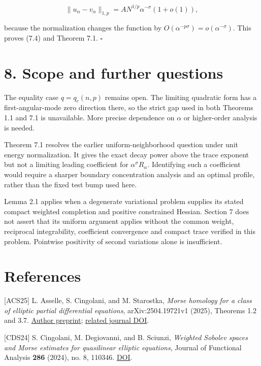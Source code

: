 \documentclass[11pt]{article}
\begin{document}
\[
\|u_\alpha-v_\alpha\|_{1,p}
=A N^{1/p}\alpha^{-\sigma}(1+o(1)),
\tag{7.18}
\]

because the normalization changes the function by
\(O(\alpha^{-p\sigma})=o(\alpha^{-\sigma})\). This proves (7.4) and
Theorem 7.1. \(\square\)

\section{8. Scope and further
questions}\label{scope-and-further-questions}

The equality case \(q=q_c(n,p)\) remains open. The limiting quadratic
form has a first-angular-mode zero direction there, so the strict gap
used in both Theorems 1.1 and 7.1 is unavailable. More precise
dependence on \(\alpha\) or higher-order analysis is needed.

Theorem 7.1 resolves the earlier uniform-neighborhood question under
unit energy normalization. It gives the exact decay power above the
trace exponent but not a limiting leading coefficient for
\(\alpha^\sigma R_\alpha\). Identifying such a coefficient would require
a sharper boundary concentration analysis and an optimal profile, rather
than the fixed test bump used here.

Lemma 2.1 applies when a degenerate variational problem supplies its
stated compact weighted completion and positive constrained Hessian.
Section 7 does not assert that its uniform argument applies without the
common weight, reciprocal integrability, coefficient convergence and
compact trace verified in this problem. Pointwise positivity of second
variations alone is insufficient.

\raggedright{}\section{References}\label{references}

{[}ACS25{]} L. Asselle, S. Cingolani, and M. Starostka, \emph{Morse
homology for a class of elliptic partial differential equations},
arXiv:2504.19721v1 (2025), Theorems 1.2 and 3.7.
\href{https://arxiv.org/abs/2504.19721}{Author preprint};
\href{https://doi.org/10.1142/S0219199726500082}{related journal DOI}.

{[}CDS24{]} S. Cingolani, M. Degiovanni, and B. Sciunzi, \emph{Weighted
Sobolev spaces and Morse estimates for quasilinear elliptic equations},
Journal of Functional Analysis \textbf{286} (2024), no. 8, 110346.
\href{https://doi.org/10.1016/j.jfa.2024.110346}{DOI}.
\end{document}
